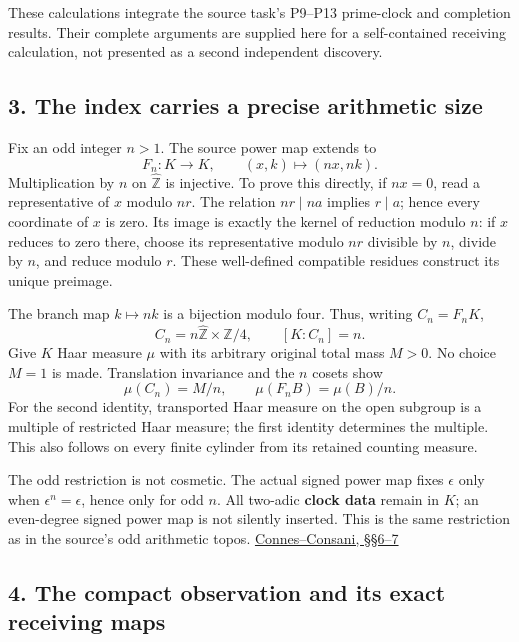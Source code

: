 \documentclass[
]{article}
\begin{document}
These calculations integrate the source task's P9--P13 prime-clock and
completion results. Their complete arguments are supplied here for a
self-contained receiving calculation, not presented as a second
independent discovery.

\subsection{3. The index carries a precise arithmetic
size}\label{the-index-carries-a-precise-arithmetic-size}

Fix an odd integer \(n>1\). The source power map extends to \[
F_n:K\longrightarrow K,\qquad (x,k)\longmapsto(nx,nk).
\] Multiplication by \(n\) on \(\widehat{\mathbb Z}\) is injective. To
prove this directly, if \(nx=0\), read a representative of \(x\) modulo
\(nr\). The relation \(nr\mid na\) implies \(r\mid a\); hence every
coordinate of \(x\) is zero. Its image is exactly the kernel of
reduction modulo \(n\): if \(x\) reduces to zero there, choose its
representative modulo \(nr\) divisible by \(n\), divide by \(n\), and
reduce modulo \(r\). These well-defined compatible residues construct
its unique preimage.

The branch map \(k\mapsto nk\) is a bijection modulo four. Thus, writing
\(C_n=F_nK\), \[
C_n=n\widehat{\mathbb Z}\times\mathbb Z/4,
\qquad [K:C_n]=n.
\] Give \(K\) Haar measure \(\mu\) with its arbitrary original total
mass \(M>0\). No choice \(M=1\) is made. Translation invariance and the
\(n\) cosets show \[
\mu(C_n)=M/n,\qquad \mu(F_nB)=\mu(B)/n.
\] For the second identity, transported Haar measure on the open
subgroup is a multiple of restricted Haar measure; the first identity
determines the multiple. This also follows on every finite cylinder from
its retained counting measure.

The odd restriction is not cosmetic. The actual signed power map fixes
\(\epsilon\) only when \(\epsilon^n=\epsilon\), hence only for odd
\(n\). All two-adic \textbf{clock data} remain in \(K\); an even-degree
signed power map is not silently inserted. This is the same restriction
as in the source's odd arithmetic topos.
\href{https://arxiv.org/html/2609.00299v1}{Connes--Consani, §§6--7}

\subsection{4. The compact observation and its exact receiving
maps}\label{the-compact-observation-and-its-exact-receiving-maps}
\end{document}
